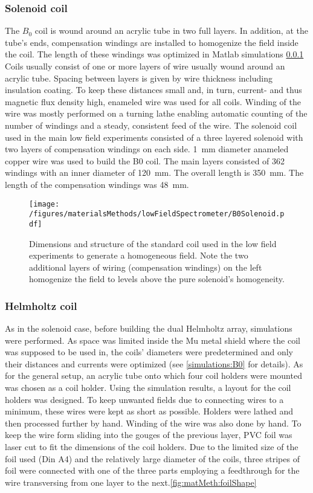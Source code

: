         \subsubsection{Solenoid coil}
            The $B_0$ coil is wound around an acrylic tube in two full layers. In addition, at the
            tube's ends, compensation windings are installed to homogenize the field inside the coil.
            The length of these windings was optimized in Matlab simulations \ref{} 
            Coils usually consist of one or more layers of wire usually wound around an acrylic tube. Spacing between layers is given by wire thickness including insulation coating. To keep  these distances small and, in turn, current- and thus magnetic flux density high, enameled wire was used for all coils. Winding of the wire was mostly performed on a turning lathe enabling automatic counting of the number of windings and a steady, consistent feed of the wire.
            The solenoid coil used in the main low field experiments consisted of a three layered solenoid with two layers of compensation windings on each side. \SI{1}{\mm} diameter anameled copper wire was used to build the B0 coil. The main layers consisted of 362 windings with an inner diameter of \SI{120}{\mm}. The overall length is \SI{350}{\milli\meter}. The length of the compensation windings was \SI{48}{\mm}.
            \begin{figure}
                \centering
                \texttt{[image: /figures/materialsMethods/lowFieldSpectrometer/B0Solenoid.pdf]}
                \caption[B0 coil layout]{Dimensions and structure of the standard coil used in the low field experiments to generate a homogeneous field. Note the two additional layers of wiring (compensation windings) on the left homogenize the field to levels above the pure solenoid's homogeneity.}
                \label{fig:matMeth:b0Solenoid}
            \end{figure}
        \subsubsection{Helmholtz coil}
        \label{sec:matMeth:Helmholtz}
        As in the solenoid case, before building the dual Helmholtz array, simulations were performed.  As space was limited inside the Mu metal shield where the coil was supposed to be used in, the coils' diameters were predetermined and only their distances and currents were optimized (see \ref{simulations:B0} for details). As for the general setup, an acrylic tube onto which four coil holders were mounted was chosen as a coil holder. Using the simulation results, a layout for the coil holders was designed. To keep unwanted fields due to connecting wires to a minimum, these wires were kept as short as possible. Holders were lathed and then processed further by hand. Winding of the wire was also done by hand. To keep the wire form sliding into the gouges of the previous layer, PVC foil was laser cut to fit the dimensions of the coil holders. Due to the limited size of the foil used (Din A4) and the relatively large diameter of the coils, three stripes of foil were connected with one of the three parts employing a feedthrough for the wire transversing from one layer to the next.\ref{fig:matMeth:foilShape}
